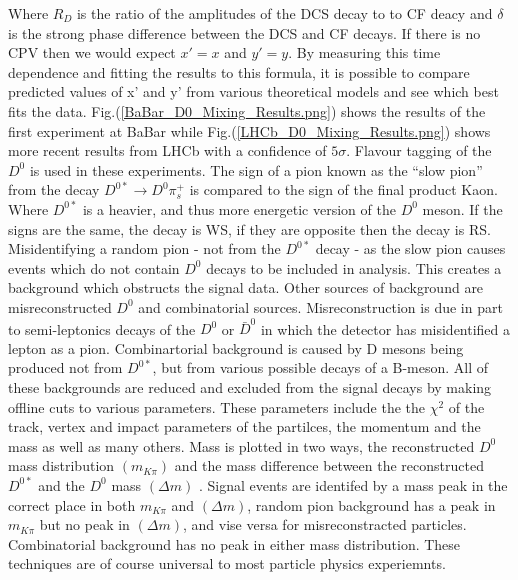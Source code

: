 \noindent Where $R_{D}$ is the ratio of the amplitudes of the DCS decay to to CF deacy and $\delta$ is the strong phase difference between the DCS and CF decays. If there is no CPV then we would expect $x' = x$ and $y' = y$. By measuring this time dependence and fitting the results to this formula, it is possible to compare predicted values of x' and y' from various theoretical models and see which best fits the data. Fig.(\ref{BaBar_D0_Mixing_Results.png}) shows the results of the first experiment at BaBar while Fig.(\ref{LHCb_D0_Mixing_Results.png}) shows more recent results from LHCb with a confidence of $5 \sigma$. Flavour tagging of the $D^{0}$ is used in these experiments. The sign of a pion known as the ``slow pion'' from the decay $D^{0*} \rightarrow D^{0} \pi^{+}_{s}$ is compared to the sign of the final product Kaon. Where $D^{0*}$ is a heavier, and thus more energetic version of the $D^{0}$ meson. If the signs are the same, the decay is WS, if they are opposite then the decay is RS. Misidentifying a random pion - not from the $D^{0*}$ decay - as the slow pion causes events which do not contain $D^{0}$ decays to be included in analysis. This creates a background which obstructs the signal data. Other sources of background are misreconstructed $D^{0}$ and combinatorial sources. Misreconstruction is due in part to semi-leptonics decays of the $D^{0}$ or $\bar{D}^{0}$ in which the detector has misidentified a lepton as a pion. Combinartorial background is caused by D mesons being produced not from $D^{0*}$, but from various possible decays of a B-meson. All of these backgrounds are reduced and excluded from the signal decays by making offline cuts to various parameters. These parameters include the the $\chi^{2}$ of the track, vertex and impact parameters of the partilces, the momentum and the mass as well as many others. Mass is plotted in two ways, the reconstructed $D^{0}$ mass distribution $(m_{K \pi})$ and the mass difference between the reconstructed $D^{0*}$ and the $D^{0}$ mass $(\Delta m)$ \cite{Kevin}. Signal events are identifed by a mass peak in the correct place in both $m_{K \pi}$ and $(\Delta m)$, random pion background has a peak in $m_{K \pi}$ but no peak in $(\Delta m)$, and vise versa for misreconstracted particles. Combinatorial background has no peak in either mass distribution. These techniques are of course universal to most particle physics experiemnts. 

